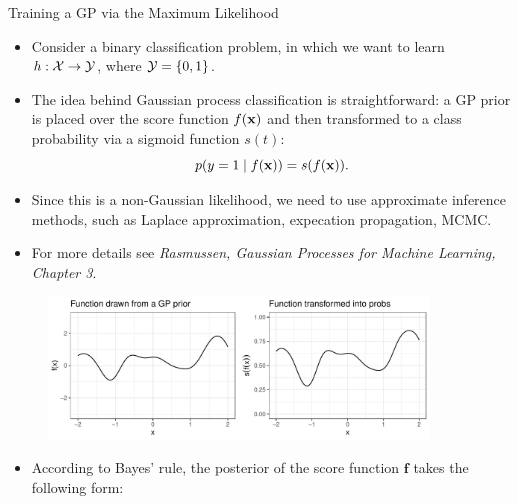 \begin{frame}[c,allowframebreaks]{Training a GP via the Maximum Likelihood}

\begin{itemize}
\item Consider a binary classification problem, in which we want to learn $h: \mathcal{X} \to \mathcal{Y}$, where $\mathcal{Y} = \{0, 1\}$. 

\lz
\item The idea behind Gaussian process classification is straightforward: a GP prior is placed over the score function $f(\mathbf{x})$ and then transformed to a class probability via a sigmoid function $s(t)$:
\vspace{-3mm}
$$p(y = 1 \mid f(\mathbf{x}) ) = s(f(\mathbf{x})).$$

\vspace{3mm}
\item Since this is a non-Gaussian likelihood, we need to use approximate inference methods, such as Laplace approximation, expecation propagation, MCMC.

\lz
\item For more details see \emph{Rasmussen, Gaussian Processes for Machine Learning, Chapter 3}.
\end{itemize}


\framebreak


\begin{figure}
\includegraphics[width=0.9\textwidth]{figure_man/gp-classif-1-1.pdf}
\end{figure}



\framebreak


\begin{itemize}

\item According to Bayes' rule, the posterior of the score function $\bm{f}$ takes the following form:


\end{itemize}
\end{frame}
